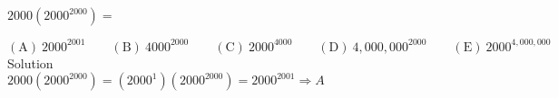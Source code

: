 

$2000(2000^{2000}) =$

$\mathrm{(A) \ 2000^{2001} } \qquad \mathrm{(B) \ 4000^{2000} } \qquad \mathrm{(C) \ 2000^{4000} } \qquad \mathrm{(D) \ 4,000,000^{2000} } \qquad \mathrm{(E) \ 2000^{4,000,000} }$
\\
Solution
\\
$2000(2000^{2000}) = (2000^{1})(2000^{2000}) = 2000^{2001} \Rightarrow \boxed{A}$
